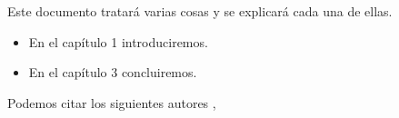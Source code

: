 Este documento tratará varias cosas y se explicará cada una de ellas.

\begin{itemize}
    \item En el capítulo 1 introduciremos.
    \item En el capítulo 3 concluiremos.
\end{itemize}

Podemos citar los siguientes autores \cite{ash}, \cite{brezis}